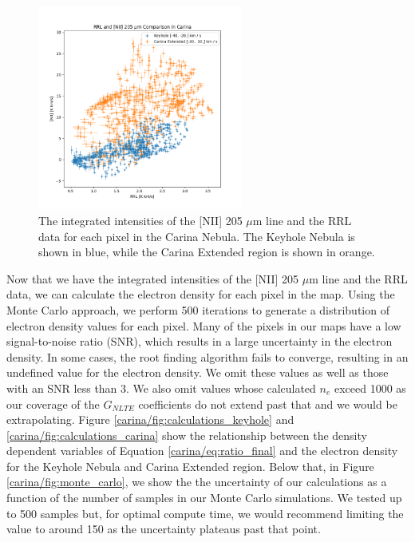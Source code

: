 \begin{figure}
    \centering
    \includegraphics[width=0.6\textwidth]{figs/carina/intensity_scatter.png}
    \caption[Integrated Intensities of {[}NII{]} 205 $\mu$m Line and RRL Data]{
        The integrated intensities of the [NII] 205 $\mu$m line and the RRL data for each pixel in the Carina Nebula.
        The Keyhole Nebula is shown in blue, while the Carina Extended region is shown in orange.
        }
    \label{carina/fig:intensity_scatter}
\end{figure}

Now that we have the integrated intensities of the [NII] 205 $\mu$m line and the RRL data, we can calculate the electron density for each pixel in the map.
Using the Monte Carlo approach, we perform 500 iterations to generate a distribution of electron density values for each pixel.
Many of the pixels in our maps have a low signal-to-noise ratio (SNR), which results in a large uncertainty in the electron density.
In some cases, the root finding algorithm fails to converge, resulting in an undefined value for the electron density.
We omit these values as well as those with an SNR less than 3.
We also omit values whose calculated $n_e$ exceed 1000 as our coverage of the $G_{NLTE}$ coefficients do not extend past that and we would be extrapolating. 
Figure \ref{carina/fig:calculations_keyhole} and \ref{carina/fig:calculations_carina} show the relationship between the density dependent variables of Equation \ref{carina/eq:ratio_final} and the electron density for the Keyhole Nebula and Carina Extended region.
Below that, in Figure \ref{carina/fig:monte_carlo}, we show the the uncertainty of our calculations as a function of the number of samples in our Monte Carlo simulations.
We tested up to 500 samples but, for optimal compute time, we would recommend limiting the value to around 150 as the uncertainty plateaus past that point. 

